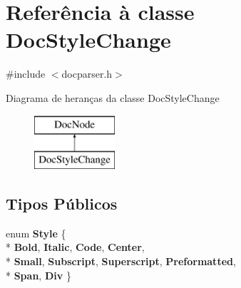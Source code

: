 \hypertarget{class_doc_style_change}{\section{Referência à classe Doc\-Style\-Change}
\label{class_doc_style_change}
}


{\ttfamily \#include $<$docparser.\-h$>$}

Diagrama de heranças da classe Doc\-Style\-Change\begin{figure}[H]
\begin{center}
\leavevmode
\includegraphics[height=2.000000cm]{class_doc_style_change}
\end{center}
\end{figure}
\subsection*{Tipos Públicos}
\begin{DoxyCompactItemize}
\item 
enum {\bfseries Style} \{ \\*
{\bfseries Bold}, 
{\bfseries Italic}, 
{\bfseries Code}, 
{\bfseries Center}, 
\\*
{\bfseries Small}, 
{\bfseries Subscript}, 
{\bfseries Superscript}, 
{\bfseries Preformatted}, 
\\*
{\bfseries Span}, 
{\bfseries Div}
 \}
\end{DoxyCompactItemize}
